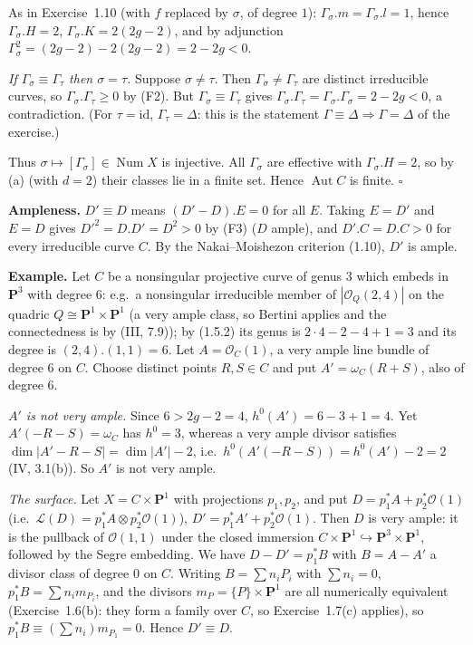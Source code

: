 \documentclass[11pt]{article}
\begin{document}
As in Exercise~1.10 (with $f$ replaced by $\sigma$, of degree $1$): $\Gamma_\sigma.m=\Gamma_\sigma.l=1$, hence $\Gamma_\sigma.H=2$, $\Gamma_\sigma.K=2(2g-2)$, and by adjunction $\Gamma_\sigma^2=(2g-2)-2(2g-2)=2-2g<0$.

\emph{If $\Gamma_\sigma\equiv\Gamma_\tau$ then $\sigma=\tau$.} Suppose $\sigma\ne\tau$. Then $\Gamma_\sigma\neq\Gamma_\tau$ are distinct irreducible curves, so $\Gamma_\sigma.\Gamma_\tau\ge0$ by (F2). But $\Gamma_\sigma\equiv\Gamma_\tau$ gives $\Gamma_\sigma.\Gamma_\tau=\Gamma_\sigma.\Gamma_\sigma=2-2g<0$, a contradiction. (For $\tau=\mathrm{id}$, $\Gamma_\tau=\Delta$: this is the statement $\Gamma\equiv\Delta\Rightarrow\Gamma=\Delta$ of the exercise.)

Thus $\sigma\mapsto[\Gamma_\sigma]\in\operatorname{Num}X$ is injective. All $\Gamma_\sigma$ are effective with $\Gamma_\sigma.H=2$, so by (a) (with $d=2$) their classes lie in a finite set. Hence $\operatorname{Aut}C$ is finite. \hfill$\square$

\pf
\textbf{Ampleness.} $D'\equiv D$ means $(D'-D).E=0$ for all $E$. Taking $E=D'$ and $E=D$ gives $D'^2=D.D'=D^2>0$ by (F3) ($D$ ample), and $D'.C=D.C>0$ for every irreducible curve $C$. By the Nakai--Moishezon criterion (1.10), $D'$ is ample.

\textbf{Example.} Let $C$ be a nonsingular projective curve of genus $3$ which embeds in $\mathbf P^3$ with degree $6$: e.g.\ a nonsingular irreducible member of $|\mathcal O_Q(2,4)|$ on the quadric $Q\cong\mathbf P^1\times\mathbf P^1$ (a very ample class, so Bertini applies and the connectedness is by (III, 7.9)); by (1.5.2) its genus is $2\cdot4-2-4+1=3$ and its degree is $(2,4).(1,1)=6$. Let $A=\mathcal O_C(1)$, a very ample line bundle of degree $6$ on $C$. Choose distinct points $R,S\in C$ and put $A'=\omega_C(R+S)$, also of degree $6$.

\emph{$A'$ is not very ample.} Since $6>2g-2=4$, $h^0(A')=6-3+1=4$. Yet $A'(-R-S)=\omega_C$ has $h^0=3$, whereas a very ample divisor satisfies $\dim|A'-R-S|=\dim|A'|-2$, i.e.\ $h^0(A'(-R-S))=h^0(A')-2=2$ (IV, 3.1(b)). So $A'$ is not very ample.

\emph{The surface.} Let $X=C\times\mathbf P^1$ with projections $p_1,p_2$, and put $D=p_1^*A+p_2^*\mathcal O(1)$ (i.e.\ $\mathcal L(D)=p_1^*A\otimes p_2^*\mathcal O(1)$), $D'=p_1^*A'+p_2^*\mathcal O(1)$. Then $D$ is very ample: it is the pullback of $\mathcal O(1,1)$ under the closed immersion $C\times\mathbf P^1\hookrightarrow\mathbf P^3\times\mathbf P^1$, followed by the Segre embedding. We have $D-D'=p_1^*B$ with $B=A-A'$ a divisor class of degree $0$ on $C$. Writing $B=\sum n_iP_i$ with $\sum n_i=0$, $p_1^*B=\sum n_im_{P_i}$, and the divisors $m_{P}=\{P\}\times\mathbf P^1$ are all numerically equivalent (Exercise~1.6(b): they form a family over $C$, so Exercise~1.7(c) applies), so $p_1^*B\equiv(\sum n_i)m_{P_1}=0$. Hence $D'\equiv D$.
\end{document}
